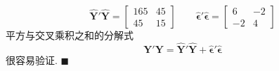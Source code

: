 
\[
\hat{\mathbf{Y}}'\hat{\mathbf{Y}}=\begin{bmatrix}165&45\\45&15\end{bmatrix}\qquad\hat{\boldsymbol{\epsilon}}'\hat{\boldsymbol{\epsilon}}=\begin{bmatrix}6&-2\\-2&4\end{bmatrix}
\]
平方与交叉乘积之和的分解式
\[
\mathbf{Y}'\mathbf{Y}=\hat{\mathbf{Y}}'\hat{\mathbf{Y}}+\hat{\boldsymbol{\epsilon}}'\hat{\boldsymbol{\epsilon}}
\]
很容易验证. \hfill$\blacksquare$

\begin{mvfigure}
\end{mvfigure}
